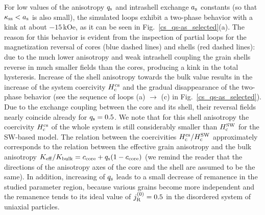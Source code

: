 \documentclass[prm,twocolumn,showkeys,preprintnumbers,amsmath,amssymb,superscriptaddress,aps,10pt]{revtex4-1}
\begin{document}
For low values of the anisotropy $q_{\rm s}$ and intrashell exchange $a_{\rm s}$ constants (so that $\kappa_{\rm ss} < a_{\rm s}$ is also small), the simulated loops exhibit a two-phase behavior with a kink at about $-15 \, \mathrm{kOe}$, as it can be seen in Fig.~\ref{cs_qs-as_selected}(a). The reason for this behavior is evident from the inspection of partial loops for the magnetization reversal of cores (blue dashed lines) and shells (red dashed lines): due to the much lower anisotropy and weak intrashell coupling the grain shells reverse in much smaller fields than the cores, producing a kink in the total hysteresis. Increase of the shell anisotropy towards the bulk value results in the increase of the system coercivity $H_{\rm c}^{\rm cs}$ and the gradual disappearance of the two-phase behavior (see the sequence of loops (a) $\rightarrow$ (c) in Fig.~\ref{cs_qs-as_selected}). Due to the exchange coupling between the core and its shell, their reversal fields nearly coincide already for $q_{\rm s} = 0.5$. We note that for this shell anisotropy the coercivity $H_{\rm c}^{\rm cs}$ of the whole system is still considerably smaller than $H_{\rm c}^{\rm SW}$ for the SW-based model. The relation between the coercivities $H_{\rm c}^{\rm cs}/H_{\rm c}^{\rm SW}$ approximately corresponds to the relation between the effective grain anisotropy and the bulk anisotropy $K_{\rm eff}/K_{\rm bulk} = c_{\rm core}+q_{\rm s}(1-c_{\rm core})$ (we remind the reader that the directions of the anisotropy axes of the core and the shell are assumed to be the same). In addition, increasing of $q_{\rm s}$ leads to a small decrease of remanence in the studied parameter region, because various grains become more independent and the remanence tends to its ideal value of $j_{\rm R}^{(0)} = 0.5$ in the disordered system of uniaxial particles.
\end{document}
